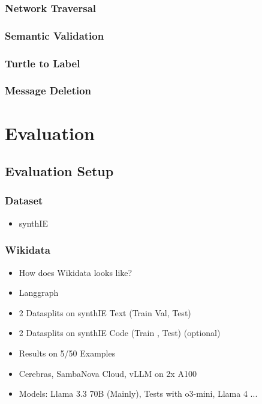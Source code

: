\documentclass[a4paper,oneside,bibliography=totoc]{scrbook}
\begin{document}
\subsection{Network Traversal}
\label{subsec:network_traversal}
\subsection{Semantic Validation}
\label{subsec:semantic_validation}
\subsection{Turtle to Label}
\label{subsec:turtle_to_label}
\subsection{Message Deletion}
\label{subsec:message_deletion}

\chapter{Evaluation}
\label{ch:evaluation}
\section{Evaluation Setup}
\label{sec:evaluation_setup}
\subsection{Dataset}
\label{sec:dataset}
\begin{itemize}
  \item synthIE
\end{itemize}
\subsection{Wikidata}
\label{sec:wikidata}
\begin{itemize}
  \item How does Wikidata looks like?
\end{itemize}
\begin{itemize}
  \item Langgraph
  \item 2 Datasplits on synthIE Text (Train Val, Test)
  \item 2 Datasplits on synthIE Code (Train , Test) (optional)
  \item Results on 5/50 Examples
  \item Cerebras, SambaNova Cloud, vLLM on 2x A100
  \item Models: Llama 3.3 70B (Mainly), Tests with o3-mini, Llama 4 ...
\end{itemize}
\end{document}
